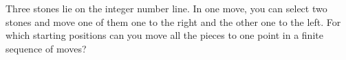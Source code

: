 Three stones lie on the integer number line. In one move,
you can select two stones and move one of them one to the right and the other one to the left.
For which starting positions can you move all the pieces to one point in a finite sequence of moves?
